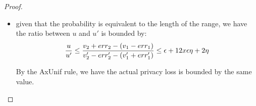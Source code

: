 \documentclass[a4paper,11pt]{article}
\begin{document}
\begin{proof}
\begin{itemize}
	\item given that the probability is equivalent to the length of the range, we have the ratio between $u$ and $u'$ is bounded by:
	\[
	\frac{u}{u'} 
	\leq \frac
	{v_2 + err_2 - (v_1 - err_1)}
	{v_2' - err_2' - (v_1' + err_1')}
	\leq \epsilon + 12 x \epsilon \eta + 2\eta
	\]

	By the {AxUnif} rule, we have the actual privacy loss is bounded by the same value.

\end{itemize}


\end{proof}


\newpage


\end{document}
